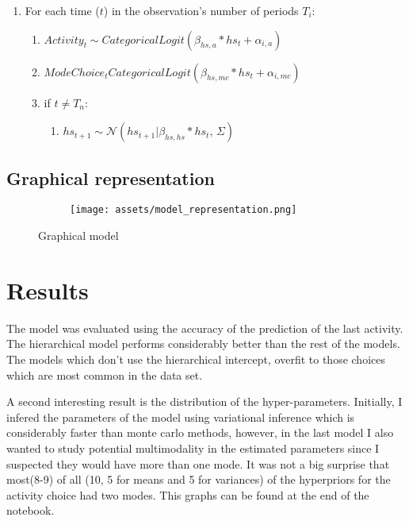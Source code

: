 \documentclass{article}
\begin{document}
\begin{enumerate}
\begin{enumerate}
\begin{enumerate}
        \end{enumerate}
        \item For each time ($t$) in the observation's number of periods $T_{i}$:
        \begin{enumerate}
            \item $Activity_{t} \sim CategoricalLogit(\beta_{hs, a}*hs_{t}+\alpha_{i, a})$
            \item $ModeChoice_{t} CategoricalLogit(\beta_{hs, mc}*hs_{t}+\alpha_{i, mc})$
            \item if $t \neq T_{n}$:
            \begin{enumerate}
                \item $hs_{t+1} \sim \mathcal{N}(hs_{t+1} | \beta_{hs, hs}*hs_{t}, \, \Sigma)$
            \end{enumerate}
        \end{enumerate}
    \end{enumerate}
\end{enumerate}

\subsection{Graphical representation}

\begin{figure}[htp!]
    \centering
    \begin{subfigure}[b]{\textwidth}
        \texttt{[image: assets/model\_representation.png]}
    \end{subfigure}
    \caption{Graphical model}
    \label{fig:graphical_model}
\end{figure}

\section{Results}

The model was evaluated using the accuracy of the prediction of the last activity. The hierarchical model performs considerably better than the rest of the models. The models which don't use the hierarchical intercept, overfit to those choices which are most common in the data set.

A second interesting result is the distribution of the hyper-parameters. Initially, I infered the parameters of the model using variational inference which is considerably faster than monte carlo methods, however, in the last model I also wanted to study potential multimodality in the estimated parameters since I suspected they would have more than one mode. It was not a big surprise that most(8-9) of all (10, 5 for means and 5 for variances) of the hyperpriors for the activity choice had two modes. This graphs can be found at the end of the notebook. 
\end{document}
